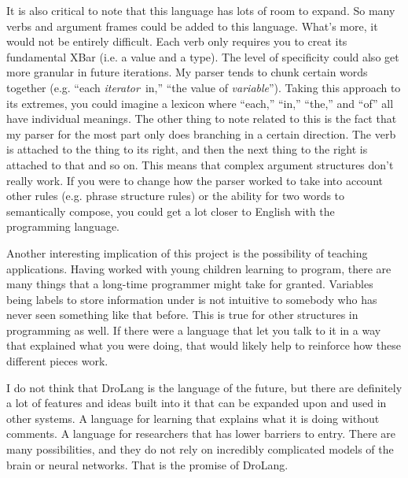 \documentclass[titlepage]{article}
\newcommand{\langName}{DroLang}
\begin{document}
It is also critical to note that this language has lots of room to expand. So many verbs and argument frames could be added to this language. What's more, it would not be entirely difficult. Each verb only requires you to creat its fundamental XBar (i.e. a value and a type). The level of specificity could also get more granular in future iterations. My parser tends to chunk certain words together (e.g. ``each \textlangle\textit{iterator}\textrangle\ in,'' ``the value of \textlangle\textit{variable}\textrangle''). Taking this approach to its extremes, you could imagine a lexicon where ``each,'' ``in,'' ``the,'' and ``of'' all have individual meanings. The other thing to note related to this is the fact that my parser for the most part only does branching in a certain direction. The verb is attached to the thing to its right, and then the next thing to the right is attached to that and so on. This means that complex argument structures don't really work. If you were to change how the parser worked to take into account other rules (e.g. phrase structure rules) or the ability for two words to semantically compose, you could get a lot closer to English with the programming language.

Another interesting implication of this project is the possibility of teaching applications. Having worked with young children learning to program, there are many things that a long-time programmer might take for granted. Variables being labels to store information under is not intuitive to somebody who has never seen something like that before. This is true for other structures in programming as well. If there were a language that let you talk to it in a way that explained what you were doing, that would likely help to reinforce how these different pieces work.

I do not think that \langName{} is the language of the future, but there are definitely a lot of features and ideas built into it that can be expanded upon and used in other systems. A language for learning that explains what it is doing without comments. A language for researchers that has lower barriers to entry. There are many possibilities, and they do not rely on incredibly complicated models of the brain or neural networks. That is the promise of \langName{}.


\newpage{}


\end{document}
